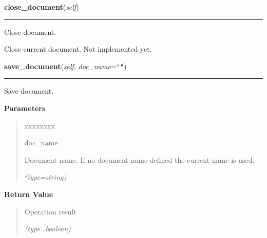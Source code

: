     \vspace{0.5ex}

\hspace{.8\funcindent}\begin{boxedminipage}{\funcwidth}

    \raggedright \textbf{close\_document}(\textit{self})

    \vspace{-1.5ex}

    \rule{\textwidth}{0.5\fboxrule}
\setlength{\parskip}{2ex}
    Close document.

    Close current document. Not implemented yet.

\setlength{\parskip}{1ex}
    \end{boxedminipage}

    \label{src:pylibratm:Template:save_document}

    \vspace{0.5ex}

\hspace{.8\funcindent}\begin{boxedminipage}{\funcwidth}

    \raggedright \textbf{save\_document}(\textit{self}, \textit{doc\_name}={\tt ""})

    \vspace{-1.5ex}

    \rule{\textwidth}{0.5\fboxrule}
\setlength{\parskip}{2ex}
    Save document.

\setlength{\parskip}{1ex}
      \textbf{Parameters}
      \vspace{-1ex}

      \begin{quote}
        \begin{Ventry}{xxxxxxxx}

          \item[doc\_name]

          Document name. If no document name defined the current name is 
          used.

            {\it (type=string)}

        \end{Ventry}

      \end{quote}

      \textbf{Return Value}
    \vspace{-1ex}

      \begin{quote}
      Operation result

      {\it (type=boolean)}

      \end{quote}

    \end{boxedminipage}

